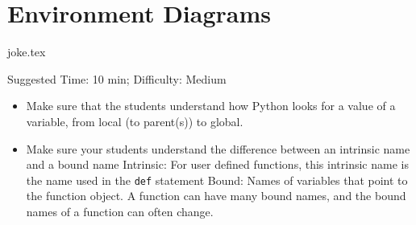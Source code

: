\documentclass{exam}
\begin{document}
\section{Environment Diagrams}
\begin{questions}
    {joke.tex}
    \begin{questionmeta}
        Suggested Time: 10 min; Difficulty: Medium
        \begin{itemize}
            \item Make sure that the students understand how Python looks for a value of a variable, from local (to parent(s)) to global.
            \item Make sure your students understand the difference between an intrinsic name and a bound name
            \subitem Intrinsic: For user defined functions, this intrinsic name is the name used in the \lstinline{def} statement 
            \subitem Bound: Names of variables that point to the function object. A function can have many bound names, and the bound names of a function can often change. 
        \end{itemize}    
      \end{questionmeta}
          
\end{questions}
\end{document}
